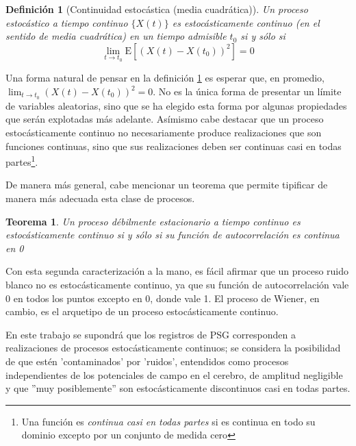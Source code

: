 \documentclass[12pt,a4paper]{mitthesis}
\newtheorem{defn}{Definici\'on}
\newtheorem{thrm}{Teorema}
\newcommand{\E}[1]{\mathrm{E}\left[ #1 \right]}
\begin{document}
\begin{defn}[Continuidad estoc\'astica (media cuadr\'atica)]
Un proceso estoc\'astico a tiempo continuo $\{ X(t) \}$ es estoc\'asticamente continuo (en el 
sentido de media cuadr\'atica) en un tiempo admisible $t_0$ si y s\'olo si
\begin{equation*}
\lim_{t \rightarrow t_0} \E{\left( X(t) - X(t_0) \right)^{2}} = 0
\end{equation*}
\label{cont_est}
\end{defn}

Una forma natural de pensar en la definici\'on \ref{cont_est} es esperar que, en promedio,
$\lim_{t \rightarrow t_0} \left( X(t) - X(t_0) \right)^{2} = 0$. 
No es la \'unica forma de presentar un l\'imite de variables aleatorias, sino que se ha elegido esta 
forma por algunas propiedades que ser\'an explotadas m\'as adelante. 
As\'imismo cabe destacar que un proceso estoc\'asticamente continuo no necesariamente produce 
realizaciones que son funciones continuas, sino que sus realizaciones deben ser continuas casi en 
todas partes\footnote{Una funci\'on es \textit{continua casi en todas partes} si es continua en 
todo su dominio excepto por un conjunto de medida cero}.

De manera m\'as general, cabe mencionar un teorema que permite tipificar de manera m\'as
adecuada esta clase de procesos.

\begin{thrm}
Un proceso d\'ebilmente estacionario a tiempo continuo es estoc\'asticamente continuo si y s\'olo 
si su funci\'on de autocorrelaci\'on es continua en 0
\end{thrm}

Con esta segunda caracterizaci\'on a la mano, es f\'acil afirmar que un proceso ruido blanco no es 
estoc\'asticamente continuo, ya que su funci\'on de autocorrelaci\'on vale 0 en todos los puntos
excepto en 0, donde vale 1. 
El proceso de Wiener, en cambio, es el arquetipo de un proceso estoc\'asticamente continuo.

En este trabajo se supondr\'a que los registros de PSG corresponden a realizaciones de procesos 
estoc\'asticamente continuos; se considera la posibilidad de que est\'en 'contaminados' por 
'ruidos', entendidos como procesos independientes de los potenciales de campo en el cerebro, de 
amplitud negligible y que ''muy posiblemente'' son estoc\'asticamente discontinuos casi en todas 
partes.

\end{document}
